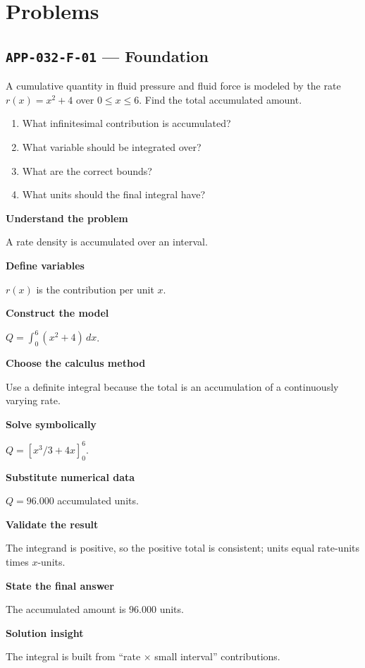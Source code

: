 \documentclass[11pt]{book}
\newcommand{\pid}[1]{\texttt{#1}}
\begin{document}
\section*{Problems}
\subsection*{\pid{APP-032-F-01} — Foundation}
\begin{problembox}
A cumulative quantity in fluid pressure and fluid force is modeled by the rate $r(x)=x^2+4$ over $0\le x\le 6$. Find the total accumulated amount.
\end{problembox}
\begin{promptbox}\begin{enumerate}
\item What infinitesimal contribution is accumulated?
\item What variable should be integrated over?
\item What are the correct bounds?
\item What units should the final integral have?
\end{enumerate}\end{promptbox}
\begin{solutionbox}
\textbf{Understand the problem}\par A rate density is accumulated over an interval.\par\medskip
\textbf{Define variables}\par $r(x)$ is the contribution per unit $x$.\par\medskip
\textbf{Construct the model}\par $Q=\int_0^{6}(x^2+4)\,dx$.\par\medskip
\textbf{Choose the calculus method}\par Use a definite integral because the total is an accumulation of a continuously varying rate.\par\medskip
\textbf{Solve symbolically}\par $Q=[x^3/3+4x]_0^{6}$.\par\medskip
\textbf{Substitute numerical data}\par $Q=96.000$ accumulated units.\par\medskip
\textbf{Validate the result}\par The integrand is positive, so the positive total is consistent; units equal rate-units times $x$-units.\par\medskip
\textbf{State the final answer}\par The accumulated amount is $96.000$ units.\par\medskip
\textbf{Solution insight}\par The integral is built from “rate × small interval” contributions.\par\medskip
\end{solutionbox}
\end{document}
